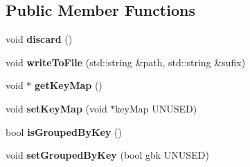 \subsection*{Public Member Functions}
\begin{DoxyCompactItemize}
\item 
\hypertarget{classfaster_1_1fddCore_a0addecf1c27311b6da3e37f77e414572}{}\label{classfaster_1_1fddCore_a0addecf1c27311b6da3e37f77e414572} 
void {\bfseries discard} ()
\item 
\hypertarget{classfaster_1_1fddCore_a9504c32481c67c2ceaf98d132ef37ee6}{}\label{classfaster_1_1fddCore_a9504c32481c67c2ceaf98d132ef37ee6} 
void {\bfseries write\+To\+File} (std\+::string \&path, std\+::string \&sufix)
\item 
\hypertarget{classfaster_1_1fddCore_a7dcd1b146c23c5f5ba149a6fc2bc7741}{}\label{classfaster_1_1fddCore_a7dcd1b146c23c5f5ba149a6fc2bc7741} 
void $\ast$ {\bfseries get\+Key\+Map} ()
\item 
\hypertarget{classfaster_1_1fddCore_ae268b85e9f217e3942600c11b8aa3347}{}\label{classfaster_1_1fddCore_ae268b85e9f217e3942600c11b8aa3347} 
void {\bfseries set\+Key\+Map} (void $\ast$key\+Map U\+N\+U\+S\+ED)
\item 
\hypertarget{classfaster_1_1fddCore_a4ff77df4fb389f5ee6ff468f773d58f8}{}\label{classfaster_1_1fddCore_a4ff77df4fb389f5ee6ff468f773d58f8} 
bool {\bfseries is\+Grouped\+By\+Key} ()
\item 
\hypertarget{classfaster_1_1fddCore_a9a47c562a1f92f6c7f79968beb339c3d}{}\label{classfaster_1_1fddCore_a9a47c562a1f92f6c7f79968beb339c3d} 
void {\bfseries set\+Grouped\+By\+Key} (bool gbk U\+N\+U\+S\+ED)
\end{DoxyCompactItemize}
